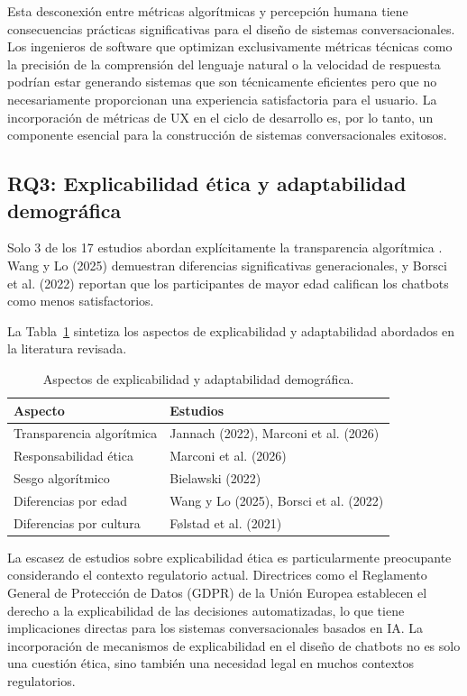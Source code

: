 \documentclass[11pt,twocolumn]{article}
\begin{document}
Esta desconexión entre métricas algorítmicas y percepción humana tiene consecuencias prácticas significativas para el diseño de sistemas conversacionales. Los ingenieros de software que optimizan exclusivamente métricas técnicas como la precisión de la comprensión del lenguaje natural o la velocidad de respuesta podrían estar generando sistemas que son técnicamente eficientes pero que no necesariamente proporcionan una experiencia satisfactoria para el usuario. La incorporación de métricas de UX en el ciclo de desarrollo es, por lo tanto, un componente esencial para la construcción de sistemas conversacionales exitosos.

\subsection{RQ3: Explicabilidad ética y adaptabilidad demográfica}

Solo 3 de los 17 estudios abordan explícitamente la transparencia algorítmica \cite{jannach2022, marconi2026, bielawski2022}. Wang y Lo (2025) \cite{wang2025} demuestran diferencias significativas generacionales, y Borsci et al. (2022) \cite{borsci2022} reportan que los participantes de mayor edad califican los chatbots como menos satisfactorios.

La Tabla~\ref{tab:rq3} sintetiza los aspectos de explicabilidad y adaptabilidad abordados en la literatura revisada.

\begin{table}[H]
\centering
\caption{Aspectos de explicabilidad y adaptabilidad demográfica.}
\label{tab:rq3}
\begin{tabular}{@{}p{3.5cm}p{3.5cm}@{}}
\toprule
\textbf{Aspecto} & \textbf{Estudios} \\
\midrule
Transparencia algorítmica & Jannach (2022), Marconi et al. (2026) \\
Responsabilidad ética & Marconi et al. (2026) \\
Sesgo algorítmico & Bielawski (2022) \\
Diferencias por edad & Wang y Lo (2025), Borsci et al. (2022) \\
Diferencias por cultura & Følstad et al. (2021) \\
\bottomrule
\end{tabular}
\end{table}

La escasez de estudios sobre explicabilidad ética es particularmente preocupante considerando el contexto regulatorio actual. Directrices como el Reglamento General de Protección de Datos (GDPR) de la Unión Europea establecen el derecho a la explicabilidad de las decisiones automatizadas, lo que tiene implicaciones directas para los sistemas conversacionales basados en IA. La incorporación de mecanismos de explicabilidad en el diseño de chatbots no es solo una cuestión ética, sino también una necesidad legal en muchos contextos regulatorios.
\end{document}
